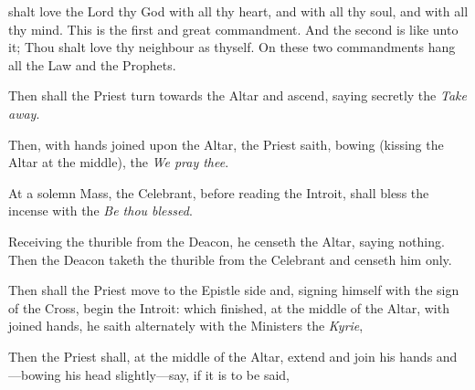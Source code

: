  shalt love the Lord thy God with all thy heart, and with all thy soul, and with all thy mind. This is the first and great commandment. And the second is like unto it; Thou shalt love thy neighbour as thyself. On these two commandments hang all the Law and the Prophets.
\begin{rubric}
    Then shall the Priest turn towards the Altar and ascend, saying secretly the \emph{Take away}.
\end{rubric}
\begin{rubric}
    Then, with hands joined upon the Altar, the Priest saith, bowing (kissing the Altar at the middle), the \emph{We pray thee}.
\end{rubric}
\begin{rubric}
    At a solemn Mass, the Celebrant, before reading the Introit, shall bless the incense with the \emph{Be thou blessed}.
\end{rubric}
\begin{rubric}
	Receiving the thurible from the Deacon, he censeth the Altar, saying nothing. Then the Deacon taketh the thurible from the Celebrant and censeth him only.
\end{rubric}
\begin{rubric}
    Then shall the Priest move to the Epistle side and, signing himself with the sign of the Cross, begin the Introit: which finished, at the middle of the Altar, with joined hands, he saith alternately with the Ministers the \emph{Kyrie},
\end{rubric}
\begin{rubric}
    Then the Priest shall, at the middle of the Altar, extend and join his hands and---bowing his head slightly---say, if it is to be said,
\end{rubric}
